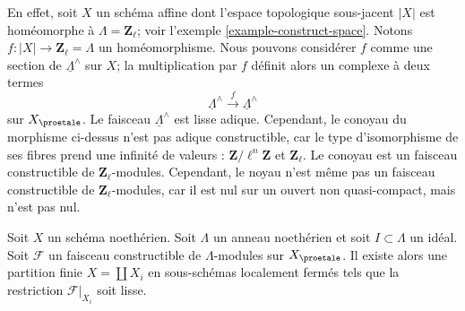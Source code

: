 \medskip\noindent
En effet, soit $X$ un schéma affine dont l'espace topologique sous-jacent $|X|$
est homéomorphe à $\Lambda = \mathbf{Z}_\ell$; voir
l'exemple \ref{example-construct-space}. Notons
$f : |X| \to \mathbf{Z}_\ell = \Lambda$
un homéomorphisme. Nous pouvons considérer $f$ comme une section de
$\underline{\Lambda}^\wedge$ sur $X$; la multiplication par $f$
définit alors un complexe à deux termes
$$
\underline{\Lambda}^\wedge \xrightarrow{f} \underline{\Lambda}^\wedge
$$
sur $X_\proetale$. Le faisceau $\underline{\Lambda}^\wedge$ est lisse adique.
Cependant, le conoyau du morphisme ci-dessus n'est pas adique constructible, car
le type d'isomorphisme de ses fibres prend une infinité
de valeurs : $\mathbf{Z}/\ell^n\mathbf{Z}$ et $\mathbf{Z}_\ell$.
Le conoyau est un faisceau constructible de $\mathbf{Z}_\ell$-modules.
Cependant, le noyau n'est même pas un faisceau constructible de $\mathbf{Z}_\ell$-modules,
car il est nul sur un ouvert non quasi-compact, mais n'est pas nul.

\begin{lemma}
\label{lemma-Noetherian-constructible}
Soit $X$ un schéma noethérien. Soit $\Lambda$ un anneau noethérien et
soit $I \subset \Lambda$ un idéal. Soit $\mathcal{F}$ un
faisceau constructible de $\Lambda$-modules sur $X_\proetale$.
Il existe alors une partition finie $X = \coprod X_i$ en
sous-schémas localement fermés tels que la restriction $\mathcal{F}|_{X_i}$
soit lisse.
\end{lemma}

